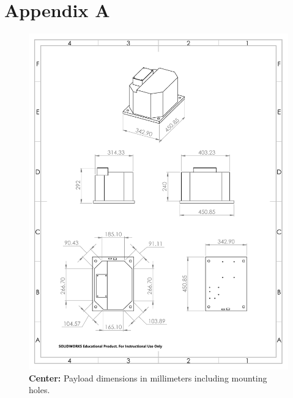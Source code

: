 \newpage
\section{Appendix A}
\label{sec:Appendix A}

\begin{figure}[!h] 
\begin{center}
\includegraphics[scale=.7]{./Figures/Payload_Dim.pdf}
\caption{{\bf Center:} Payload dimensions in millimeters including mounting holes.}
\label{fig:payload_dim}
\end{center}
\end{figure} 
